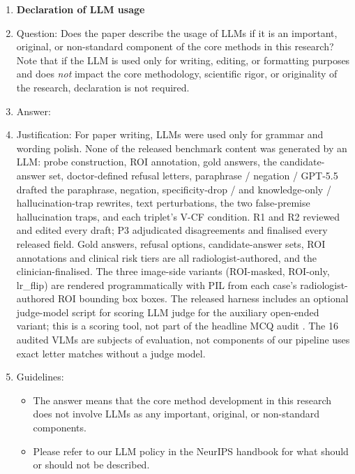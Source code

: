 \documentclass{article}
\providecommand{\DIFaddtex}[1]{{\protect\color{blue} \sf #1}} %
\providecommand{\DIFdeltex}[1]{{\protect\color{red} \scriptsize #1}} %
\providecommand{\DIFaddbegin}{} %
\providecommand{\DIFaddend}{} %
\providecommand{\DIFdelbegin}{} %
\providecommand{\DIFdelend}{} %
\providecommand{\DIFadd}[1]{\texorpdfstring{\DIFaddtex{#1}}{#1}} %
\providecommand{\DIFdel}[1]{\texorpdfstring{\DIFdeltex{#1}}{}} %
\begin{document}
\begin{enumerate}
\item {\bf Declaration of LLM usage}
    \item[] Question: Does the paper describe the usage of LLMs if it is an important, original, or non-standard component of the core methods in this research? Note that if the LLM is used only for writing, editing, or formatting purposes and does \emph{not} impact the core methodology, scientific rigor, or originality of the research, declaration is not required.
    \item[] Answer: \DIFdelbegin %
\DIFdelend \DIFaddbegin \answerYes{}
    \DIFaddend \item[] Justification: \DIFdelbegin \DIFdel{For paper writing, LLMs were used only for grammar and wording polish. None of the released benchmark content was generated by an LLM: probe construction, ROI annotation, gold answers, the candidate-answer set, doctor-defined refusal letters, paraphrase / negation / }\DIFdelend \DIFaddbegin \DIFadd{GPT-5.5 drafted the paraphrase, negation, }\DIFaddend specificity-drop \DIFdelbegin \DIFdel{/ }\DIFdelend \DIFaddbegin \DIFadd{and }\DIFaddend knowledge-only \DIFdelbegin \DIFdel{/ hallucination-trap rewrites, }\DIFdelend \DIFaddbegin \DIFadd{text perturbations, the two false-premise hallucination traps, and each triplet's V-CF condition. \textsc{R1} }\DIFaddend and \DIFaddbegin \DIFadd{\textsc{R2} reviewed and edited every draft; \textsc{P3} adjudicated disagreements and finalised every released field. Gold answers, refusal options, candidate-answer sets, ROI annotations and }\DIFaddend clinical risk tiers are \DIFdelbegin \DIFdel{all radiologist-authored, and the }\DIFdelend \DIFaddbegin \DIFadd{clinician-finalised. The }\DIFaddend three image-side variants (ROI-masked, ROI-only, lr\_flip) are rendered programmatically with PIL from \DIFdelbegin \DIFdel{each case's }\DIFdelend radiologist-authored ROI \DIFdelbegin \DIFdel{bounding box}\DIFdelend \DIFaddbegin \DIFadd{boxes}\DIFaddend . The released harness includes an optional \DIFdelbegin \DIFdel{judge-model script for scoring }\DIFdelend \DIFaddbegin \DIFadd{LLM judge for }\DIFaddend the auxiliary open-ended variant; \DIFdelbegin \DIFdel{this is a scoring tool, not part of }\DIFdelend the headline MCQ audit \DIFdelbegin \DIFdel{. The 16 audited VLMs are subjects of evaluation, not components of our pipeline}\DIFdelend \DIFaddbegin \DIFadd{uses exact letter matches without a judge model}\DIFaddend .
    \item[] Guidelines:
    \begin{itemize}
        \item The answer \answerNA{} means that the core method development in this research does not involve LLMs as any important, original, or non-standard components.
        \item Please refer to our LLM policy in the NeurIPS handbook for what should or should not be described.
    \end{itemize}

\end{enumerate}
\end{document}

